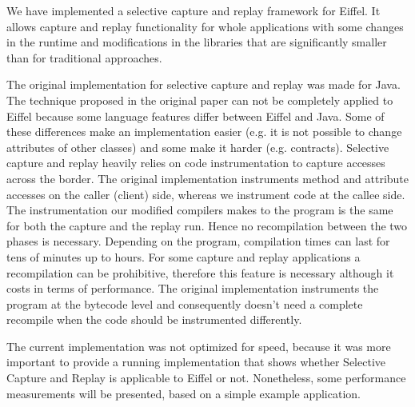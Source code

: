We have implemented a selective capture and replay framework for Eiffel. It allows capture and replay functionality for whole applications with some changes in the runtime and modifications in the libraries that are significantly smaller than for traditional approaches.

The original implementation for selective capture and replay was made for Java. The technique proposed in the original paper can not be completely applied to Eiffel because some language features differ between Eiffel and Java. Some of these differences make an implementation easier (e.g. it is not possible to change attributes of other classes) and some make it harder (e.g. contracts). Selective capture and replay heavily relies on code instrumentation to capture accesses across the border. The original implementation instruments method and attribute accesses on the caller (client) side, whereas we instrument code at the callee side. %
The instrumentation our modified compilers makes to the program is the same for both the capture and the replay run. Hence no recompilation between the two phases is necessary. Depending on the program, compilation times can last for tens of minutes up to hours. For some capture and replay applications a recompilation can be prohibitive, therefore this feature is necessary although it costs in terms of performance. The original implementation instruments the program at the bytecode level and consequently doesn't need a complete recompile when the code should be instrumented differently.

The current implementation was not optimized for speed, because it was more important to provide a running implementation that shows whether Selective Capture and Replay is applicable to Eiffel or not. Nonetheless, some performance measurements will be presented, based on a simple example application.


